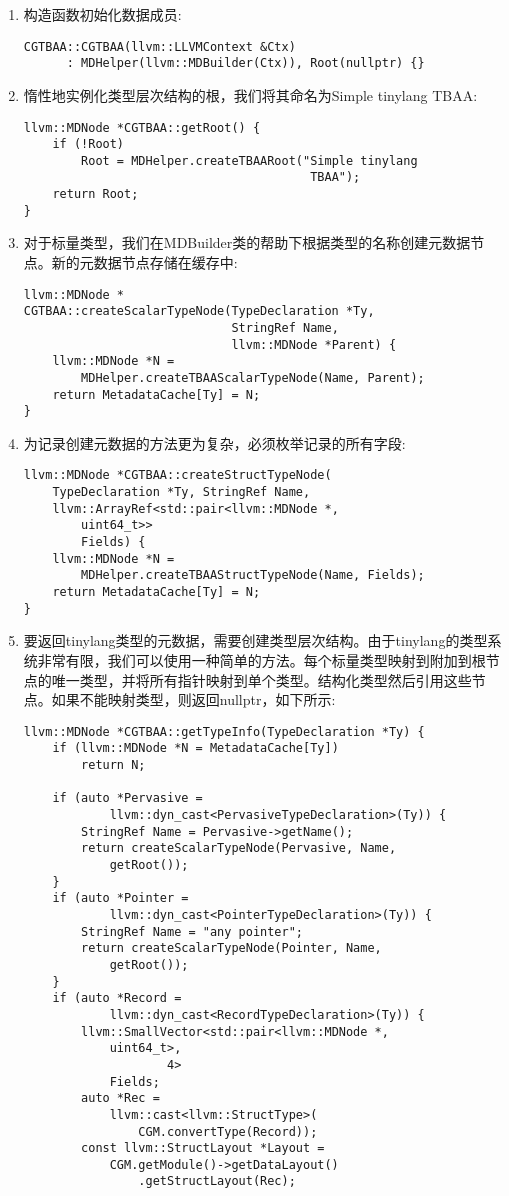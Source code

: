 \begin{enumerate}
\item 构造函数初始化数据成员:
\begin{lstlisting}[caption={}]
CGTBAA::CGTBAA(llvm::LLVMContext &Ctx)
	  : MDHelper(llvm::MDBuilder(Ctx)), Root(nullptr) {}
\end{lstlisting}

\item 惰性地实例化类型层次结构的根，我们将其命名为Simple tinylang TBAA:
\begin{lstlisting}[caption={}]
llvm::MDNode *CGTBAA::getRoot() {
	if (!Root)
		Root = MDHelper.createTBAARoot("Simple tinylang 
										TBAA");
	return Root;
}
\end{lstlisting}

\item 对于标量类型，我们在MDBuilder类的帮助下根据类型的名称创建元数据节点。新的元数据节点存储在缓存中:
\begin{lstlisting}[caption={}]
llvm::MDNode *
CGTBAA::createScalarTypeNode(TypeDeclaration *Ty,
							 StringRef Name,
							 llvm::MDNode *Parent) {
	llvm::MDNode *N =
		MDHelper.createTBAAScalarTypeNode(Name, Parent);
	return MetadataCache[Ty] = N;
}
\end{lstlisting}

\item 为记录创建元数据的方法更为复杂，必须枚举记录的所有字段:
\begin{lstlisting}[caption={}]
llvm::MDNode *CGTBAA::createStructTypeNode(
	TypeDeclaration *Ty, StringRef Name,
	llvm::ArrayRef<std::pair<llvm::MDNode *, 
		uint64_t>>
		Fields) {
	llvm::MDNode *N =
		MDHelper.createTBAAStructTypeNode(Name, Fields);
	return MetadataCache[Ty] = N;
}
\end{lstlisting}

\item 要返回tinylang类型的元数据，需要创建类型层次结构。由于tinylang的类型系统非常有限，我们可以使用一种简单的方法。每个标量类型映射到附加到根节点的唯一类型，并将所有指针映射到单个类型。结构化类型然后引用这些节点。如果不能映射类型，则返回nullptr，如下所示:
\begin{lstlisting}[caption={}]
llvm::MDNode *CGTBAA::getTypeInfo(TypeDeclaration *Ty) {
	if (llvm::MDNode *N = MetadataCache[Ty])
		return N;
	
	if (auto *Pervasive =
			llvm::dyn_cast<PervasiveTypeDeclaration>(Ty)) {
		StringRef Name = Pervasive->getName();
		return createScalarTypeNode(Pervasive, Name, 
			getRoot());
	}
	if (auto *Pointer =
			llvm::dyn_cast<PointerTypeDeclaration>(Ty)) {
		StringRef Name = "any pointer";
		return createScalarTypeNode(Pointer, Name, 
			getRoot());
	}
	if (auto *Record =
			llvm::dyn_cast<RecordTypeDeclaration>(Ty)) {
		llvm::SmallVector<std::pair<llvm::MDNode *, 
			uint64_t>,
					4>
			Fields;
		auto *Rec =
			llvm::cast<llvm::StructType>(
				CGM.convertType(Record));
		const llvm::StructLayout *Layout =
			CGM.getModule()->getDataLayout()
				.getStructLayout(Rec);
			

\end{lstlisting}
\end{enumerate}

